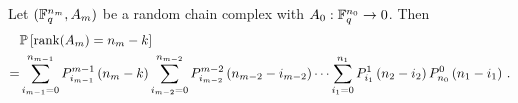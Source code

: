 


\begin{theorem}\label{thmProbranks}
Let $(\mathbb{F}_q^{n_m}, A_m)$ be a random chain complex with $A_0:\mathbb{F}_q^{n_0}\to 0$.  Then
\begin{align*}
 &  \mathbb{P}\left[\operatorname{\mathrm{rank}}(A_{m}) = n_{m} - k\right]\\
=& 	\sum_{i_{m-1}=0}^{n_{m-1}} P_{i_{m-1}}^{m-1}\left(n_{m} -k\right)
	\sum_{i_{m-2}=0}^{n_{m-2}} P_{i_{m-2}}^{m-2}\left(n_{m-2} - i_{m-2}\right)
		\cdots
        \sum_{i_1 = 0}^{n_1} P_{i_1}^1\left(n_2 - i_2\right) P_{n_0}^0 \left(n_1 - i_1\right) \, .
\end{align*}
\end{theorem}
